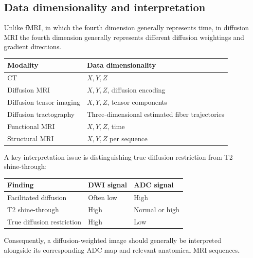 \subsection{Data dimensionality and interpretation}
Unlike fMRI, in which the fourth dimension generally represents time, in diffusion MRI the fourth dimension generally represents different diffusion weightings and gradient directions.
\begin{center}
\begin{tabular}{@{}ll@{}}
\toprule
\textbf{Modality} & \textbf{Data dimensionality} \\
\midrule
CT & $X, Y, Z$ \\
Diffusion MRI & $X, Y, Z$, diffusion encoding \\
Diffusion tensor imaging & $X, Y, Z$, tensor components \\
Diffusion tractography & Three-dimensional estimated fiber trajectories \\
Functional MRI & $X, Y, Z$, time \\
Structural MRI & $X, Y, Z$ per sequence \\
\bottomrule
\end{tabular}
\end{center}

A key interpretation issue is distinguishing true diffusion restriction from T2 shine-through:
\begin{center}
\begin{tabular}{@{}lll@{}}
\toprule
\textbf{Finding} & \textbf{DWI signal} & \textbf{ADC signal} \\
\midrule
Facilitated diffusion & Often low & High \\
T2 shine-through & High & Normal or high \\
True diffusion restriction & High & Low \\
\bottomrule
\end{tabular}
\end{center}
Consequently, a diffusion-weighted image should generally be interpreted alongside its corresponding ADC map and relevant anatomical MRI sequences.

